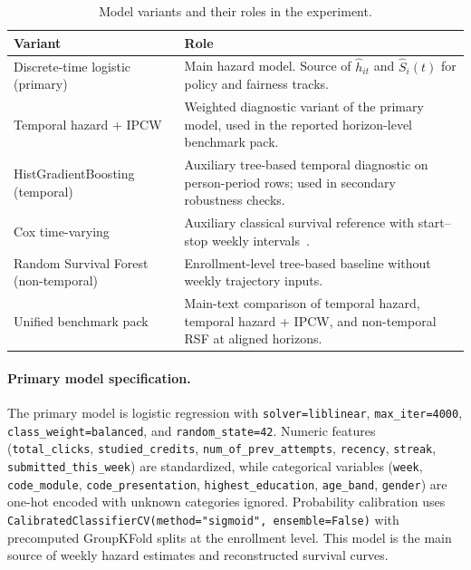 \begin{table}[!t]
\centering
\footnotesize
\renewcommand{\arraystretch}{1.05}
\caption{Model variants and their roles in the experiment.}
\label{tab:model_variants}
\begin{tabular}{@{}p{} p{}@{}}
\hline
Variant & Role \\
\hline
Discrete-time logistic (primary) &
  Main hazard model. Source of $\hat h_{it}$ and $\hat S_i(t)$ for policy and fairness tracks. \\
Temporal hazard + IPCW &
  Weighted diagnostic variant of the primary model, used in the reported horizon-level benchmark pack. \\
HistGradientBoosting (temporal) &
  Auxiliary tree-based temporal diagnostic on person-period rows; used in secondary robustness checks. \\
Cox time-varying &
  Auxiliary classical survival reference with start--stop weekly intervals~\cite{Cox1972RegressionModels}. \\
Random Survival Forest (non-temporal) &
  Enrollment-level tree-based baseline without weekly trajectory inputs. \\
Unified benchmark pack &
  Main-text comparison of temporal hazard, temporal hazard + IPCW, and non-temporal RSF at aligned horizons. \\
\hline
\end{tabular}
\end{table}

\paragraph*{Primary model specification.}
The primary model is logistic regression with \texttt{solver=liblinear}, \texttt{max\_iter=4000}, \texttt{class\_weight=balanced}, and \texttt{random\_state=42}. Numeric features (\texttt{total\_clicks}, \texttt{studied\_credits}, \texttt{num\_of\_prev\_attempts}, \texttt{recency}, \texttt{streak}, \texttt{submitted\_this\_week}) are standardized, while categorical variables (\texttt{week}, \texttt{code\_module}, \texttt{code\_presentation}, \texttt{highest\_education}, \texttt{age\_band}, \texttt{gender}) are one-hot encoded with unknown categories ignored. Probability calibration uses \texttt{CalibratedClassifierCV(method=\allowbreak"sigmoid", ensemble=False)} with precomputed GroupKFold splits at the enrollment level. This model is the main source of weekly hazard estimates and reconstructed survival curves.

